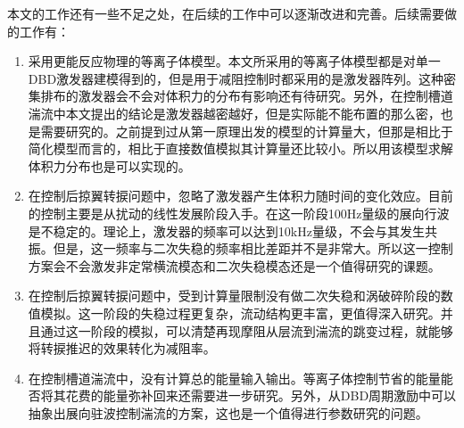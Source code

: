 本文的工作还有一些不足之处，在后续的工作中可以逐渐改进和完善。后续需要做的工作有：
\begin{enumerate}
  \item 采用更能反应物理的等离子体模型。本文所采用的等离子体模型都是对单一DBD激发器建模得到的，但是用于减阻控制时都采用的是激发器阵列。这种密集排布的激发器会不会对体积力的分布有影响还有待研究。另外，在控制槽道湍流中本文提出的结论是激发器越密越好，但是实际能不能布置的那么密，也是需要研究的。之前提到过从第一原理出发的模型的计算量大，但那是相比于简化模型而言的，相比于直接数值模拟其计算量还比较小。所以用该模型求解体积力分布也是可以实现的。
  \item 在控制后掠翼转捩问题中，忽略了激发器产生体积力随时间的变化效应。目前的控制主要是从扰动的线性发展阶段入手。在这一阶段100Hz量级的展向行波是不稳定的。理论上，激发器的频率可以达到10kHz量级，不会与其发生共振。但是，这一频率与二次失稳的频率相比差距并不是非常大。所以这一控制方案会不会激发非定常横流模态和二次失稳模态还是一个值得研究的课题。
  \item 在控制后掠翼转捩问题中，受到计算量限制没有做二次失稳和涡破碎阶段的数值模拟。这一阶段的失稳过程更复杂，流动结构更丰富，更值得深入研究。并且通过这一阶段的模拟，可以清楚再现摩阻从层流到湍流的跳变过程，就能够将转捩推迟的效果转化为减阻率。
  \item 在控制槽道湍流中，没有计算总的能量输入输出。等离子体控制节省的能量能否将其花费的能量弥补回来还需要进一步研究。另外，从DBD周期激励中可以抽象出展向驻波控制湍流的方案，这也是一个值得进行参数研究的问题。
\end{enumerate}


